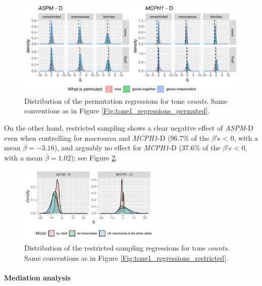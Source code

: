 \documentclass[twoside,onecolumn]{article}
\begin{document}
\begin{figure}[h]
  \centering
  \includegraphics[width=\textwidth]{../../code/figures/tone_counts_regressions_permuted}
  \caption{Distribution of the permutation regressions for tone \textit{counts}. Same conventions as in Figure \ref{Fig:tone1_regressions_permuted}.}
  \label{Fig:tone_counts_regressions_permuted}
\end{figure}

On the other hand, restricted sampling shows a clear negative effect of \textit{ASPM}-D even when controlling for macroarea and \textit{MCPH1}-D (96.7\% of the $\beta$'s < 0, with a mean $\overline{\beta} = -3.16$), and arguably no effect for \textit{MCPH1}-D (37.6\% of the $\beta$'s < 0, with a mean $\overline{\beta} = 1.02$); see Figure \ref{Fig:tone_counts_regressions_restricted}.

\begin{figure}[h]
  \centering
  \includegraphics[width=0.6\textwidth]{../../code/figures/tone_counts_regressions_restricted}
  \caption{Distribution of the restricted sampling regressions for tone \textit{counts}. Same conventions as in Figure \ref{Fig:tone1_regressions_restricted}.}
  \label{Fig:tone_counts_regressions_restricted}
\end{figure}


\paragraph{Mediation analysis}
\end{document}
